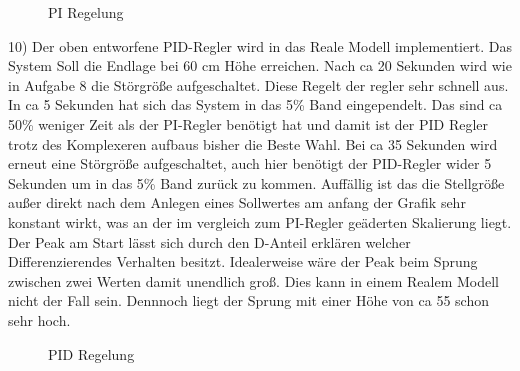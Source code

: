 \documentclass[10pt]{scrartcl}
\begin{document}
\begin{figure} [H]
\begin{center}
\caption{PI Regelung } 
\end{center}
\end{figure}
10) Der oben entworfene PID-Regler wird in das Reale Modell implementiert.
Das System Soll die Endlage bei 60 cm Höhe erreichen. Nach ca 20 Sekunden wird wie in Aufgabe 8 die Störgröße aufgeschaltet. Diese Regelt der regler sehr schnell aus. In ca 5 Sekunden hat sich das System in das 5\% Band eingependelt. Das sind ca 50\% weniger Zeit als der PI-Regler benötigt hat und damit ist der PID Regler trotz des Komplexeren aufbaus bisher die Beste Wahl.
Bei ca 35 Sekunden wird erneut eine Störgröße aufgeschaltet, auch hier benötigt der PID-Regler wider 5 Sekunden um in das 5\% Band zurück zu kommen.
Auffällig ist das die Stellgröße außer direkt nach dem Anlegen eines Sollwertes am anfang der Grafik sehr konstant wirkt, was an der im vergleich zum PI-Regler geäderten Skalierung liegt.
Der Peak am Start lässt sich durch den D-Anteil erklären welcher Differenzierendes Verhalten besitzt. Idealerweise wäre der Peak beim Sprung zwischen zwei Werten damit unendlich groß. Dies kann in einem Realem Modell nicht der Fall sein. Dennnoch liegt der Sprung mit einer Höhe von ca 55 schon sehr hoch.
\begin{figure} [H]
\caption{PID Regelung} 
\end{figure}
\end{document}
